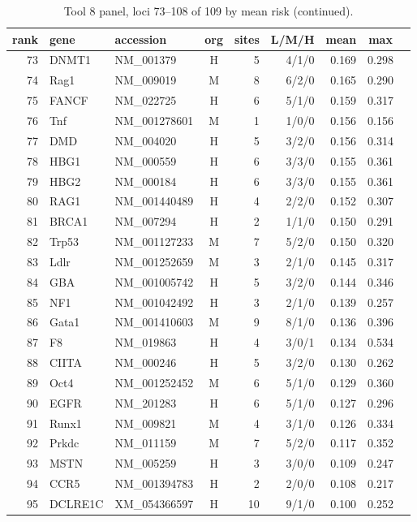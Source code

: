 \begin{table}[h]
\centering\footnotesize
\caption{Tool 8 panel, loci 73--108 of 109 by mean risk (continued).}
\begin{tabular}{rllcrrrcc}
\hline
rank & gene & accession & org & sites & L/M/H & mean & max \\
\hline
73 & DNMT1 & NM\_001379 & H & 5 & 4/1/0 & 0.169 & 0.298 \\
74 & Rag1 & NM\_009019 & M & 8 & 6/2/0 & 0.165 & 0.290 \\
75 & FANCF & NM\_022725 & H & 6 & 5/1/0 & 0.159 & 0.317 \\
76 & Tnf & NM\_001278601 & M & 1 & 1/0/0 & 0.156 & 0.156 \\
77 & DMD & NM\_004020 & H & 5 & 3/2/0 & 0.156 & 0.314 \\
78 & HBG1 & NM\_000559 & H & 6 & 3/3/0 & 0.155 & 0.361 \\
79 & HBG2 & NM\_000184 & H & 6 & 3/3/0 & 0.155 & 0.361 \\
80 & RAG1 & NM\_001440489 & H & 4 & 2/2/0 & 0.152 & 0.307 \\
81 & BRCA1 & NM\_007294 & H & 2 & 1/1/0 & 0.150 & 0.291 \\
82 & Trp53 & NM\_001127233 & M & 7 & 5/2/0 & 0.150 & 0.320 \\
83 & Ldlr & NM\_001252659 & M & 3 & 2/1/0 & 0.145 & 0.317 \\
84 & GBA & NM\_001005742 & H & 5 & 3/2/0 & 0.144 & 0.346 \\
85 & NF1 & NM\_001042492 & H & 3 & 2/1/0 & 0.139 & 0.257 \\
86 & Gata1 & NM\_001410603 & M & 9 & 8/1/0 & 0.136 & 0.396 \\
87 & F8 & NM\_019863 & H & 4 & 3/0/1 & 0.134 & 0.534 \\
88 & CIITA & NM\_000246 & H & 5 & 3/2/0 & 0.130 & 0.262 \\
89 & Oct4 & NM\_001252452 & M & 6 & 5/1/0 & 0.129 & 0.360 \\
90 & EGFR & NM\_201283 & H & 6 & 5/1/0 & 0.127 & 0.296 \\
91 & Runx1 & NM\_009821 & M & 4 & 3/1/0 & 0.126 & 0.334 \\
92 & Prkdc & NM\_011159 & M & 7 & 5/2/0 & 0.117 & 0.352 \\
93 & MSTN & NM\_005259 & H & 3 & 3/0/0 & 0.109 & 0.247 \\
94 & CCR5 & NM\_001394783 & H & 2 & 2/0/0 & 0.108 & 0.217 \\
95 & DCLRE1C & XM\_054366597 & H & 10 & 9/1/0 & 0.100 & 0.252 \\

\end{tabular}
\end{table}
